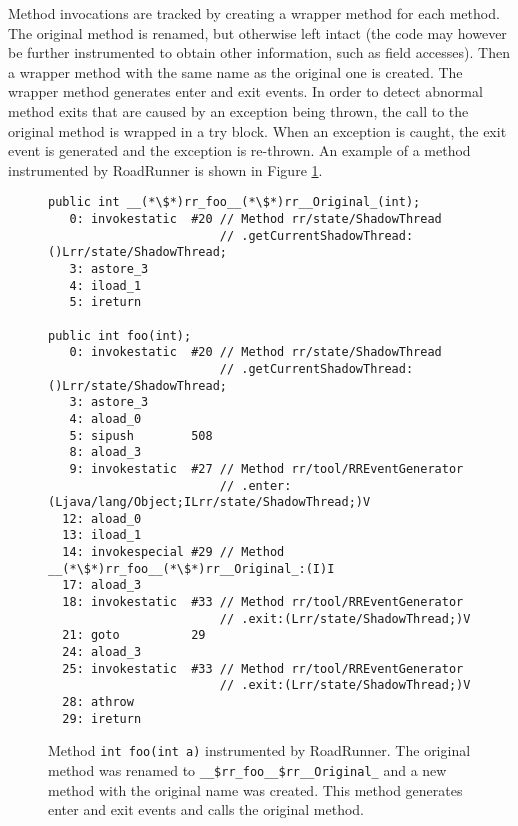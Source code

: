 Method invocations are tracked by creating a wrapper method for each method. The
original method is renamed, but otherwise left intact (the code may however be
further instrumented to obtain other information, such as field accesses). Then
a wrapper method with the same name as the original one is created. The wrapper
method generates enter and exit events. In order to detect abnormal method exits
that are caused by an exception being thrown, the call to the original method is
wrapped in a try block. When an exception is caught, the exit event is generated
and the exception is re-thrown. An example of a method instrumented by
RoadRunner is shown in Figure \ref{rrInstMethod}.

\begin{figure}[hbt]
    \label{rrInstMethod}
    \begin{lstlisting}
public int __(*\$*)rr_foo__(*\$*)rr__Original_(int);
   0: invokestatic  #20 // Method rr/state/ShadowThread
                        // .getCurrentShadowThread:()Lrr/state/ShadowThread;
   3: astore_3
   4: iload_1
   5: ireturn

public int foo(int);
   0: invokestatic  #20 // Method rr/state/ShadowThread
                        // .getCurrentShadowThread:()Lrr/state/ShadowThread;
   3: astore_3
   4: aload_0
   5: sipush        508
   8: aload_3
   9: invokestatic  #27 // Method rr/tool/RREventGenerator
                        // .enter:(Ljava/lang/Object;ILrr/state/ShadowThread;)V
  12: aload_0
  13: iload_1
  14: invokespecial #29 // Method __(*\$*)rr_foo__(*\$*)rr__Original_:(I)I
  17: aload_3
  18: invokestatic  #33 // Method rr/tool/RREventGenerator
                        // .exit:(Lrr/state/ShadowThread;)V
  21: goto          29
  24: aload_3
  25: invokestatic  #33 // Method rr/tool/RREventGenerator
                        // .exit:(Lrr/state/ShadowThread;)V
  28: athrow
  29: ireturn\end{lstlisting}
    \caption{Method \texttt{int foo(int a)} instrumented by RoadRunner. The
    original method was renamed to \texttt{\_\_\$rr\_foo\_\_\$rr\_\_Original\_}
    and a new method with the original name was created. This method generates
    enter and exit events and calls the original method.}
\end{figure}

